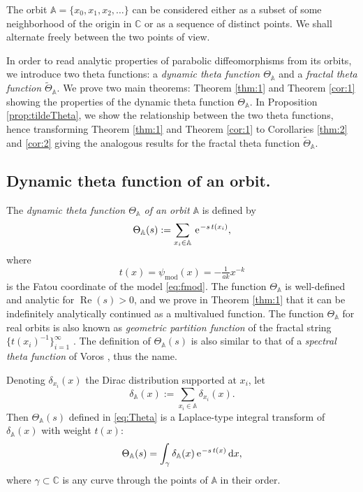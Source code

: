 \documentclass[a4paper,11pt]{amsart}
\numberwithin{equation}{section}
\newcommand{\C}{{\mathbb C}}
\newcommand{\re}{\operatorname{Re}}
\renewcommand{\d}{\ensuremath{\operatorname{d}\!}}
\newcommand{\e}{\ensuremath{\mkern.25\thinmuskip\mathrm{e}\mkern.4\thinmuskip}}
\newcommand{\model}{{\mathrm{mod}}}
\newcommand{\psimod}{\psi_\model}
\newcommand{\orbit}{\mathbb{A}}
\theoremstyle{definition}
\begin{document}
The orbit $\orbit=\{x_0,x_1,x_2,\ldots\}$ can be considered either as a subset of some neighborhood of the origin in $\C$ or as a sequence of distinct points. 
We shall alternate freely between the two points of view.


In order to read analytic properties of parabolic diffeomorphisms from its orbits, we introduce two theta functions: a \emph{dynamic theta function $\Theta_\orbit$} and a \emph{fractal theta function $\tilde\Theta_\orbit$}. We prove two main theorems: Theorem \ref{thm:1} and Theorem \ref{cor:1} showing the properties of the dynamic theta function $\Theta_\orbit$. In Proposition \ref{prop:tildeTheta}, we show the relationship between the two theta functions, hence transforming Theorem \ref{thm:1} and Theorem \ref{cor:1} to  Corollaries \ref{thm:2} and \ref{cor:2} giving the analogous results for the fractal theta function $\tilde\Theta_\orbit$. 


\subsection{Dynamic theta function of an orbit.}
The \emph{dynamic theta function $\Theta_\orbit$ of an orbit $\orbit$} is defined by
\begin{equation}\label{eq:Theta}
	\Theta_\orbit(s):=\sum_{x_i\in\orbit}\,\e^{-s\,t(x_i)}, 
\end{equation}	
where
\begin{equation}\label{eq:psimod}
	 	t(x)=\psimod(x)=-\tfrac{1}{ak}x^{-k}
\end{equation}	
is the Fatou coordinate of the model \eqref{eq:fmod}.
The function $\Theta_\orbit$ is well-defined and analytic for $\re(s)>0$, and we prove in Theorem \ref{thm:1} that it can be indefinitely analytically continued as a multivalued function. The function $\Theta_\orbit$ for  real orbits  is also known as \emph{geometric partition function} of the fractal string $\big\{t(x_i)^{-1}\big\}_{i=1}^{\infty}$ \cite{LapFr2}. The definition of  $\Theta_\orbit(s)$ is also similar to that of a \emph{spectral theta function} of Voros \cite{Voros1,Voros2}, thus the name. 

Denoting $\delta_{x_i}(x)$ the Dirac distribution supported at $x_i$, let  \[\delta_\orbit(x):=\sum_{x_i\in\orbit}\delta_{x_i}(x).\]
Then $\Theta_\orbit(s)$ defined in \eqref{eq:Theta} is a Laplace-type integral transform of $\delta_\orbit(x)$ with weight $t(x)$: 
\begin{equation}\label{eq:Thetadelta}
	\Theta_\orbit(s)=\int_{\gamma}\delta_\orbit(x)\, \e^{-s\,t(x)}\d x,
\end{equation}
where $\gamma\subset\C$ is any curve through the points of $\orbit$ in their order.
\end{document}
